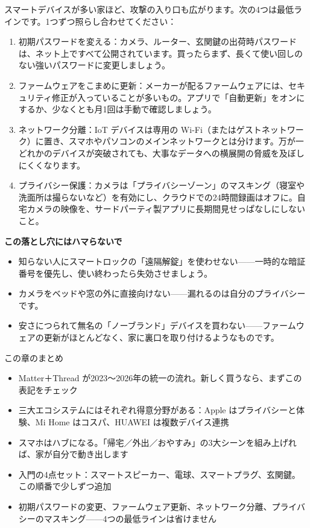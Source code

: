 
スマートデバイスが多い家ほど、攻撃の入り口も広がります。次の4つは最低ラインです。1つずつ照らし合わせてください：

\begin{enumerate}
  \item 初期パスワードを変える：カメラ、ルーター、玄関鍵の出荷時パスワードは、ネット上ですべて公開されています。買ったらまず、長くて使い回しのない強いパスワードに変更しましょう。
  \item ファームウェアをこまめに更新：メーカーが配るファームウェアには、セキュリティ修正が入っていることが多いもの。アプリで「自動更新」をオンにするか、少なくとも月1回は手動で確認しましょう。
  \item ネットワーク分離：IoT デバイスは専用の Wi-Fi（またはゲストネットワーク）に置き、スマホやパソコンのメインネットワークとは分けます。万が一どれかのデバイスが突破されても、大事なデータへの横展開の脅威を及ぼしにくくなります。
  \item プライバシー保護：カメラは「プライバシーゾーン」のマスキング（寝室や洗面所は撮らないなど）を有効にし、クラウドでの24時間録画はオフに。自宅カメラの映像を、サードパーティ製アプリに長期間見せっぱなしにしないこと。
\end{enumerate}

\textbf{この落とし穴にはハマらないで}\par

\begin{itemize}
  \item 知らない人にスマートロックの「遠隔解錠」を使わせない——一時的な暗証番号を優先し、使い終わったら失効させましょう。
  \item カメラをベッドや窓の外に直接向けない——漏れるのは自分のプライバシーです。
  \item 安さにつられて無名の「ノーブランド」デバイスを買わない——ファームウェアの更新がほとんどなく、家に裏口を取り付けるようなものです。
\end{itemize}

\begin{tcbsummary}{この章のまとめ}
\begin{itemize}
  \item Matter＋Thread が2023〜2026年の統一の流れ。新しく買うなら、まずこの表記をチェック
  \item 三大エコシステムにはそれぞれ得意分野がある：Apple はプライバシーと体験、Mi Home はコスパ、HUAWEI は複数デバイス連携
  \item スマホはハブになる。「帰宅／外出／おやすみ」の3大シーンを組み上げれば、家が自分で動き出します
  \item 入門の4点セット：スマートスピーカー、電球、スマートプラグ、玄関鍵。この順番で少しずつ追加
  \item 初期パスワードの変更、ファームウェア更新、ネットワーク分離、プライバシーのマスキング——4つの最低ラインは省けません
\end{itemize}

\end{tcbsummary}
